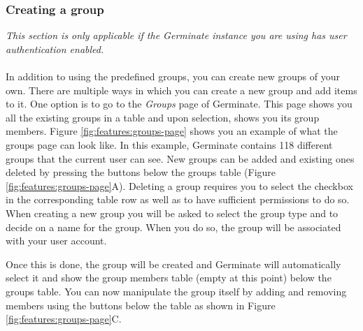 \subsubsection{Creating a group}
\textit{This section is only applicable if the Germinate instance you are using has user authentication enabled.}\\
\\
In addition to using the predefined groups, you can create new groups of your own. There are multiple ways in which you can create a new group and add items to it. One option is to go to the \textit{Groups} page of Germinate. This page shows you all the existing groups in a table and upon selection, shows you its group members. Figure \ref{fig:features:groups-page} shows you an example of what the groups page can look like. In this example, Germinate contains 118 different groups that the current user can see. New groups can be added and existing ones deleted by pressing the buttons below the groups table (Figure \ref{fig:features:groups-page}A). Deleting a group requires you to select the checkbox in the corresponding table row as well as to have sufficient permissions to do so. When creating a new group you will be asked to select the group type and to decide on a name for the group. When you do so, the group will be associated with your user account.

Once this is done, the group will be created and Germinate will automatically select it and show the group members table (empty at this point) below the groups table. You can now manipulate the group itself by adding and removing members using the buttons below the table as shown in Figure \ref{fig:features:groups-page}C.

